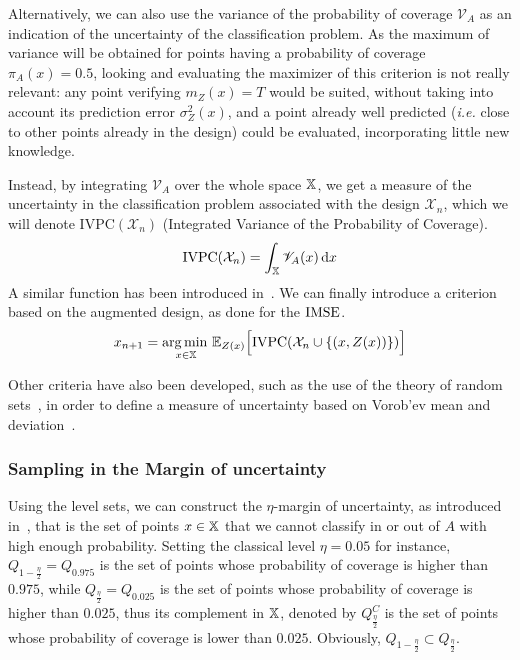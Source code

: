 \documentclass[../../Main_ManuscritThese.tex]{subfiles}
\begin{document}
Alternatively, we can also use the variance of the probability of
coverage $\mathscr{V}_A$ as an indication of the uncertainty of the
classification problem. As the maximum of variance will be obtained
for points having a probability of coverage $\pi_A(x) =0.5$, looking
and evaluating the maximizer of this criterion is not really relevant:
any point verifying $m_Z(x)=T$ would be suited, without taking into
account its prediction error $\sigma^2_Z(x)$, and a point already well
predicted (\emph{i.e.} close to other points already in the design)
could be evaluated, incorporating little new knowledge.


Instead, by integrating $\mathscr{V}_A$ over the whole space
$\mathbb{X}$, we get a measure of the uncertainty in the classification
problem associated with the design $\mathcal{X}_n$, which we will
denote $\mathrm{IVPC}(\mathcal{X}_n)$ (Integrated Variance of the
Probability of Coverage).
\begin{equation}
  \label{eq:IVPC_def}
\mathrm{IVPC}(\mathcal{X}_n) =  \int_{\mathbb{X}} \mathscr{V}_A(x)\,\mathrm{d}x
\end{equation}
A similar function has been introduced in~\cite{bect_sequential_2012}.
We can finally introduce a criterion based on the augmented design, as
done for the $\operatorname{\mathrm{IMSE}}$.
\begin{equation}
  \label{eq:expected_aIVPC}
  x_{n+1} = \operatorname*{arg\,min \,}_{x \in\mathbb{X}} \mathbb{E}_{Z(x)}\Big[\mathrm{IVPC}(\mathcal{X}_n \cup \{   \left(x, Z(x) \right)  \})\Big]
\end{equation}

Other criteria have also been developed, such as the use of the theory
of random sets~\cite{el_amri_data-driven_2019}, in order to define a
measure of uncertainty based on Vorob'ev mean and
deviation~\cite{vorobyev_new_2003}.


\subsubsection{Sampling in the Margin of uncertainty}
\label{sec:margin_of_uncertainty}

Using the level sets, we can construct the $\eta$-margin of
uncertainty, as introduced in~\cite{dubourg_reliability-based_2011},
that is the set of points $x \in \mathbb{X}$ that we cannot classify in
or out of $A$ with high enough probability.  Setting the classical
level $\eta=0.05$ for instance, $Q_{1-\frac{\eta}{2}}=Q_{0.975}$ is
the set of points whose probability of coverage is higher than
$0.975$, while $Q_{\frac{\eta}{2}}=Q_{0.025}$ is the set of points
whose probability of coverage is higher than $0.025$, thus its
complement in $\mathbb{X}$, denoted by $Q_{\frac{\eta}{2}}^C$ is the set
of points whose probability of coverage is lower than
$0.025$. Obviously, $Q_{1-\frac{\eta}{2}} \subset Q_{\frac{\eta}{2}}$.
\end{document}
